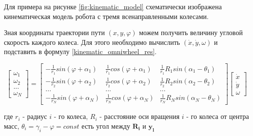 \documentclass[oneside,final,14pt]{extreport}
\newcommand{\bs}{\boldsymbol}
\begin{document}
Для примера на рисунке \ref{fig:kinematic_model} схематически изображена кинематическая модель робота с тремя всенаправленными колесами.


\begin{figure}[H]
\end{figure}

\begin{figure}[H]
\end{figure}


Зная координаты траектории пути $(x,y,\varphi)$ можем получить величину угловой скорость каждого колеса. Для этого необходимо вычислить $(\dot{x},\dot{y},\omega)$ и подставить в формулу \ref{kinematic_omniwheel_res}.

\begin{equation}
\label{kinematic_omniwheel_res}
\begin{bmatrix}
\omega_{1} \\
\omega_{2} \\
...\\
\omega_{N}
\end{bmatrix}
=
\begin{bmatrix}
-\frac{1}{r_{1}}sin(\varphi +\alpha_{1}) &
\frac{1}{r_{1}}cos(\varphi +\alpha_{1}) &
\frac{1}{r_{1}}R_{1}sin(\alpha_{1} - \theta_{1})
\\
-\frac{1}{r_{2}}sin(\varphi +\alpha_{2}) &
\frac{1}{r_{2}}cos(\varphi +\alpha_{2}) &
\frac{1}{r_{2}}R_{2}sin(\alpha_{2} - \theta_{2})
\\
... & ... & ...
\\
-\frac{1}{r_{N}}sin(\varphi +\alpha_{N}) &
\frac{1}{r_{N}}cos(\varphi +\alpha_{N}) &
\frac{1}{r_{N}}R_{N}sin(\alpha_{N} - \theta_{N})
\end{bmatrix}
\begin{bmatrix}
\dot{x} \\
\dot{y} \\
\omega
\end{bmatrix}
\end{equation}
 
где $r_{i}$ - радиус $i$ - го колеса, $R_{i}$ - расстояние оси вращения $i$ - го колеса от центра масс, $\theta_{i} = \gamma_{i} -\varphi = const$ есть угол между $\bs{R_{i}}$ и $\bs{y_{l}}$
\end{document}
